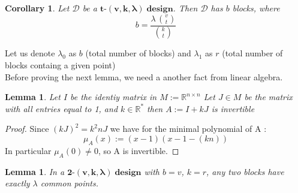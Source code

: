 \documentclass{article}
\newtheorem{lemma}[theorem]{Lemma}
\newtheorem{collary}[theorem]{Corollary}
\numberwithin{equation}{theorem}
\numberwithin{figure}{theorem}
\newcommand{\tCompleteDesign}{\ensuremath{\bm{t\mbox{-}(v,k,\lambda)\; design}}}
\newcommand{\tParamDesign}[4]{\ensuremath{\bm{#1\mbox{-}(#2,#3,#4)\; design}}}
\newcommand{\dDes}{\ensuremath{\mathscr{D}}}
\newcommand{\myMatrixRing}[2]{\ensuremath{#1^{#2\times#2}}}
\begin{document}
\begin{collary}\label{blockCount}
Let {\dDes} be a \tCompleteDesign.
Then {\dDes} has $b$ blocks, where
\[
	b = \frac{\lambda \, \binom{v}{t}}{\binom{k}{t}}
\]
\end{collary}

Let us denote $\lambda_0$ as $b$ (total number of blocks) and
$\lambda_1$ as $r$ (total number of blocks containg a given point)\\
Before proving the next lemma, we need a another fact from linear algebra.
\begin{lemma}\label{invertible}
Let $I$ be the identiy matrix in {$M := \myMatrixRing{\mathbb{R}}{n}$} Let $J \in M$ be the matrix with all entries equal to 1, and $k \in \mathbb{R}^*$ then $A := I + kJ$ is invertible
\end{lemma}
\begin{proof}
Since $(kJ)^2 = k^2 n J$ we have for the minimal polynomial of A :
\[
	\mu_A(x) := (x - 1)(x - 1 - (kn))
\]
In particular $\mu_A(0) \neq 0$, so A is invertible.
\end{proof}
\begin{lemma}\label{lambdaCommonPoints}
In a {\tParamDesign{2}{v}{k}{\lambda}} with $b = v$, $k = r$, any two blocks have exactly $\lambda$ common points.
\end{lemma}
\end{document}
